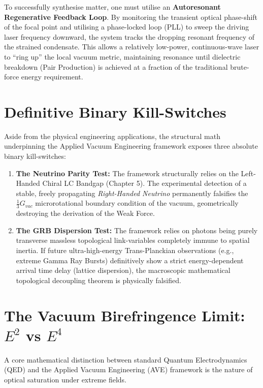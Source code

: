 To successfully synthesise matter, one must utilise an \textbf{Autoresonant Regenerative Feedback Loop}. By monitoring the transient optical phase-shift of the focal point and utilising a phase-locked loop (PLL) to sweep the driving laser frequency downward, the system tracks the dropping resonant frequency of the strained condensate. This allows a relatively low-power, continuous-wave laser to ``ring up'' the local vacuum metric, maintaining resonance until dielectric breakdown (Pair Production) is achieved at a fraction of the traditional brute-force energy requirement.

\section{Definitive Binary Kill-Switches}

Aside from the physical engineering applications, the structural math underpinning the Applied Vacuum Engineering framework exposes three absolute binary kill-switches:

\begin{enumerate}
    \item \textbf{The Neutrino Parity Test:} The framework structurally relies on the Left-Handed Chiral LC Bandgap (Chapter 5). The experimental detection of a stable, freely propagating \textit{Right-Handed Neutrino} permanently falsifies the $\frac{1}{3} G_{vac}$ microrotational boundary condition of the vacuum, geometrically destroying the derivation of the Weak Force.
    \item \textbf{The GRB Dispersion Test:} The framework relies on photons being purely transverse massless topological link-variables completely immune to spatial inertia. If future ultra-high-energy Trans-Planckian observations (e.g., extreme Gamma Ray Bursts) definitively show a strict energy-dependent arrival time delay (lattice dispersion), the macroscopic mathematical topological decoupling theorem is physically falsified.
\end{enumerate}

\section{The Vacuum Birefringence Limit: $E^2$ vs $E^4$}

A core mathematical distinction between standard Quantum Electrodynamics (QED) and the Applied Vacuum Engineering (AVE) framework is the nature of optical saturation under extreme fields. 

